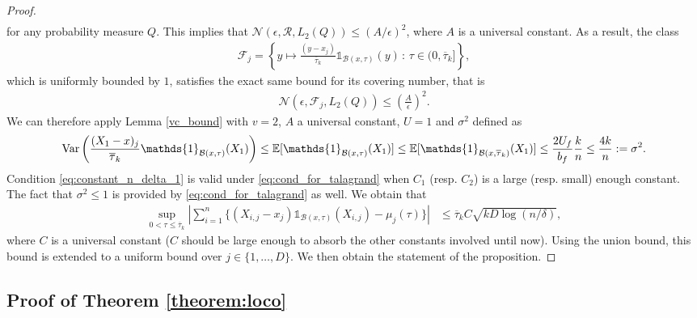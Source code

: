 \begin{proof}
\begin{align*}
\end{align*}
for any probability measure $Q$.
This implies that $ \mathcal N  \left( \epsilon , \mathcal R , L_2 (Q)  \right) \leq   \left(  {A} / { \epsilon} \right)  ^{2 }$,
where $A$ is a universal constant. As a result, the class 
\begin{align*}
\mathcal F_j = \left\{y\mapsto \frac{ (y-x_j )  }{  \overline \tau_k}    \mathds{1}_{\mathcal B (x,     \tau )}(y)  \, : \, \tau \in (0, \overline \tau_k]\right\},
\end{align*}
which is uniformly bounded by $1$,  satisfies the exact same bound for its covering number, that is
\begin{align*}
\mathcal N  \left( \epsilon , \mathcal F_j , L_2 (Q)  \right) \leq   \left( \frac {A}{ \epsilon} \right)  ^{2 }.
\end{align*}
We can therefore apply Lemma \ref{vc_bound} with $v = 2$, $A$ a universal constant, $U=1$ and $\sigma^2 $ defined as
\begin{align*}
\Var\left(  \frac{ (X_1-x)_j }{  \overline \tau_k}    \mathds{1}_{\mathcal B (x,     \tau )}(X_1) \right)\leq \mathbb E [  \mathds{1}_{\mathcal B (x,     \tau )} (X_1)] \leq  \mathbb E [  \mathds{1}_{\mathcal B (x,    \overline  \tau_k )}(X_1) ]\leq \frac{2U_f}{b_f} \frac{k}{n}\leq \frac{4k}{n}
: = \sigma^2 .
\end{align*} 
Condition \ref{eq:constant_n_delta_1} is valid under \eqref{eq:cond_for_talagrand} when $C_1$ (resp. $C_2$) is a large (resp. small) enough constant. The fact that $\sigma^2\leq 1$ is provided by  \eqref{eq:cond_for_talagrand} as well. We obtain that
\begin{align*}
 \sup_{ 0 < \tau\leq \overline \tau_k } \left|    \sum_{i = 1 }^n  \{ (X_{i,j}-x_j)\mathds{1}_{\mathcal B (x,    \tau   ) } (X_{i,j}) -  \mu_ j (   \tau )\}\right|
 & \leq \overline \tau_k   C  \sqrt {   k D \log(n   /  \delta )  } ,
\end{align*}
where $C$ is a universal constant ($C$ should be large enough to absorb the other constants involved until now). Using the union bound, this bound is extended to a uniform bound over $j\in\{1,\ldots,D\}$. We then obtain the statement of the proposition.
\end{proof}

\subsection*{Proof of Theorem \ref{theorem:loco}}

